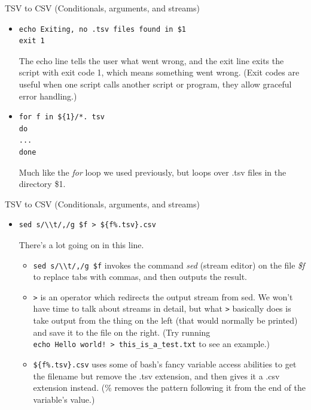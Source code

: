 \documentclass{beamer}
\begin{document}
\begin{frame}[fragile]{TSV to CSV (Conditionals, arguments, and streams)}
\begin{itemize}
\item<1->
\begin{lstlisting}
echo Exiting, no .tsv files found in $1
exit 1
\end{lstlisting} 
The echo line tells the user what went wrong, and the exit line exits the script with exit code 1, which means something went wrong. (Exit codes are useful when one script calls another script or program, they allow graceful error handling.)
\item<2->
\begin{lstlisting}
for f in ${1}/*. tsv
do
...
done
\end{lstlisting}
Much like the \emph{for} loop we used previously, but loops over .tsv files in the directory \$1.
\end{itemize}
\end{frame}

\begin{frame}[fragile]{TSV to CSV (Conditionals, arguments, and streams)}
\begin{itemize}
\item<1->
\begin{lstlisting}
sed s/\\t/,/g $f > ${f%.tsv}.csv
\end{lstlisting} 
There's a lot going on in this line.
\begin{itemize}
    \item<2-> \lstinline|sed s/\\t/,/g $f| invokes the command \emph{sed} (stream editor) on the file \emph{\$f} to replace tabs with commas, and then outputs the result.
    \item<3-> \lstinline|>| is an operator which redirects the output stream from sed. We won't have time to talk about streams in detail, but what \lstinline|>| basically does is take output from the thing on the left (that would normally be printed) and save it to the file on the right. (Try running \\\lstinline|echo Hello world! > this_is_a_test.txt| to see an example.)
    \item<4-> \lstinline|${f%.tsv}.csv| uses some of bash's fancy variable access abilities to get the filename but remove the .tsv extension, and then gives it a .csv extension instead. (\% removes the pattern following it from the end of the variable's value.)
\end{itemize} 
\end{itemize}
\end{frame}
\end{document}
